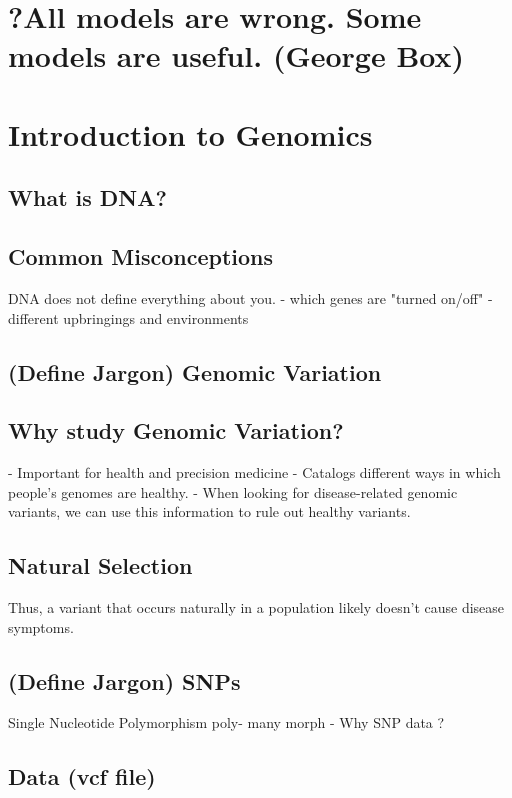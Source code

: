 \documentclass{article}
\begin{document}
\section{?All models are wrong. Some models are useful. (George Box)}

\section{Introduction to Genomics}
\subsection{What is DNA?}

\subsection{Common Misconceptions}

DNA does not define everything about you.
- which genes are "turned on/off"
- different upbringings and environments


\subsection{(Define Jargon) Genomic Variation}

\subsection{Why study Genomic Variation?}
- Important for health and precision medicine
- Catalogs different ways in which people's genomes are healthy.
- When looking for disease-related genomic variants, we can use this information to rule out healthy variants.

\subsection{Natural Selection}

Thus, a variant that occurs naturally in a population likely doesn't cause disease symptoms.

\subsection{(Define Jargon) SNPs}
Single Nucleotide Polymorphism
poly- many
morph - 
Why SNP data ?

\subsection{Data (vcf file)}
\end{document}
